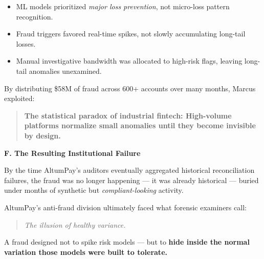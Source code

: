 \begin{itemize}
    \item ML models prioritized \textit{major loss prevention}, not micro-loss pattern recognition.
    \item Fraud triggers favored real-time spikes, not slowly accumulating long-tail losses.
    \item Manual investigative bandwidth was allocated to high-risk flags, leaving long-tail anomalies unexamined.
\end{itemize}

By distributing \$58M of fraud across 600+ accounts over many months, Marcus exploited:

\begin{quote}
    \textbf{The statistical paradox of industrial fintech:  
    High-volume platforms normalize small anomalies until they become invisible by design.}
\end{quote}

\medskip

\textbf{F. The Resulting Institutional Failure}

By the time AltumPay’s auditors eventually aggregated historical reconciliation failures, the fraud was no longer happening —  
it was already historical --- buried under months of synthetic but \textit{compliant-looking} activity.

AltumPay’s anti-fraud division ultimately faced what forensic examiners call:

\begin{quote}
    \textit{The illusion of healthy variance.}
\end{quote}

A fraud designed not to spike risk models --- but to \textbf{hide inside the normal variation those models were built to tolerate.}

